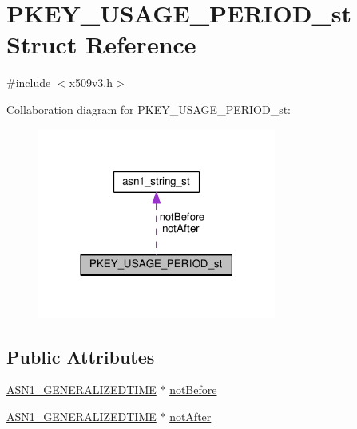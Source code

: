 \hypertarget{struct_p_k_e_y___u_s_a_g_e___p_e_r_i_o_d__st}{}\section{P\+K\+E\+Y\+\_\+\+U\+S\+A\+G\+E\+\_\+\+P\+E\+R\+I\+O\+D\+\_\+st Struct Reference}
\label{struct_p_k_e_y___u_s_a_g_e___p_e_r_i_o_d__st}


{\ttfamily \#include $<$x509v3.\+h$>$}



Collaboration diagram for P\+K\+E\+Y\+\_\+\+U\+S\+A\+G\+E\+\_\+\+P\+E\+R\+I\+O\+D\+\_\+st\+:
\nopagebreak
\begin{figure}[H]
\begin{center}
\leavevmode
\includegraphics[width=222pt]{struct_p_k_e_y___u_s_a_g_e___p_e_r_i_o_d__st__coll__graph}
\end{center}
\end{figure}
\subsection*{Public Attributes}
\begin{DoxyCompactItemize}
\item 
\hyperlink{ossl__typ_8h_abd19ea5b527807ce3a516e6a41440f84}{A\+S\+N1\+\_\+\+G\+E\+N\+E\+R\+A\+L\+I\+Z\+E\+D\+T\+I\+ME} $\ast$ \hyperlink{struct_p_k_e_y___u_s_a_g_e___p_e_r_i_o_d__st_a242441661347dbe5bb0006a542f39d2c}{not\+Before}
\item 
\hyperlink{ossl__typ_8h_abd19ea5b527807ce3a516e6a41440f84}{A\+S\+N1\+\_\+\+G\+E\+N\+E\+R\+A\+L\+I\+Z\+E\+D\+T\+I\+ME} $\ast$ \hyperlink{struct_p_k_e_y___u_s_a_g_e___p_e_r_i_o_d__st_afe94d8f367b6bfb458c1df5081908cac}{not\+After}
\end{DoxyCompactItemize}


